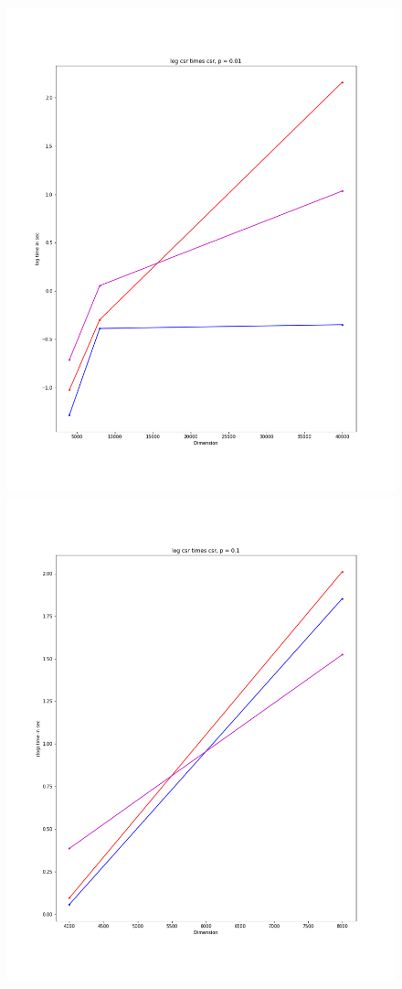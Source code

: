 \documentclass[12pt]{article}
\begin{document}
\begin{figure}[h]
  \includegraphics[scale = 0.16]{log_csr_csr_01.PNG}
  \includegraphics[scale = 0.16]{log_csr_csr_1.PNG}

\end{figure}
\end{document}
